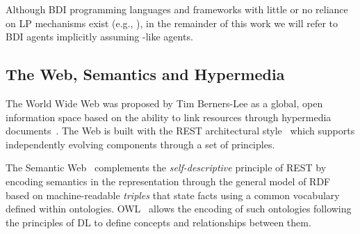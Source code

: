 \documentclass[
]{ceurart}
\begin{document}
%
Although \ac{BDI} programming languages and frameworks with little or no reliance on \ac{LP} mechanisms exist
(e.g., \cite{map2005sp,kampik2019emas}),
in the remainder of this work we will refer to \ac{BDI} agents implicitly assuming -like agents.

\subsection{The Web, Semantics and Hypermedia}

The World Wide Web was proposed by Tim Berners-Lee as a global, open information space
based on the ability to link resources through hypermedia documents~\cite{DBLP:journals/cn/Berners-LeeCG92}.
%
The Web is built with the \ac{REST} architectural style~\cite{DBLP:journals/toit/FieldingT02}
which supports independently evolving components through a set of principles.
%

The Semantic Web~\cite{BernersLee2001} complements the \emph{self-descriptive} principle of \ac{REST}
by encoding semantics in the representation through the general model of \ac{RDF}~\cite{RDF_Concepts_W3C:14}
based on machine-readable \emph{triples}
that state facts using a common vocabulary defined within ontologies.
%
{OWL}~\cite{OWL_Syntax_W3C:12} allows the encoding of such ontologies following the principles of \ac{DL} to define concepts and relationships between them.
%
\end{document}
